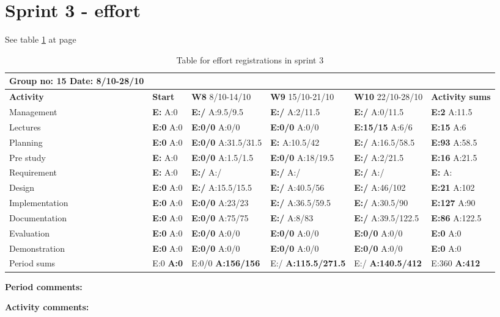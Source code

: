 \section{Sprint 3 - effort}

See table \ref{tab:effortweekss3} at page \pageref{tab:effortweekss3}
\begin{table}
\begin{tabularx}{\linewidth}{>{\setlength\hsize{.625\hsize}}X|>{\setlength\hsize{0.3\hsize}}X|>{\setlength\hsize{0.5\hsize}}X|>{\setlength\hsize{0.5\hsize}}X|>{\setlength\hsize{0.5\hsize}}X|>{\setlength\hsize{.3\hsize}}X}
Group no: 15 Date: 8/10-28/10  \\ \hline
\textbf{Activity} & \textbf{Start} & \textbf{W8} 8/10-14/10 & \textbf{W9} 15/10-21/10 & \textbf{W10} 22/10-28/10 & \textbf{Activity sums} \\ \hline \hline
Management & \textbf{E:} A:0 & \textbf{E:/} A:9.5/9.5 & \textbf{E:/} A:2/11.5 & \textbf{E:/} A:0/11.5 & \textbf{E:2} A:11.5  \\ \hline
Lectures & \textbf{E:0} A:0 & \textbf{E:0/0} A:0/0 & \textbf{E:0/0} A:0/0 & \textbf{E:15/15} A:6/6 & \textbf{E:15} A:6  \\ \hline
Planning & \textbf{E:0} A:0 & \textbf{E:0/0} A:31.5/31.5 & \textbf{E:} A:10.5/42 & \textbf{E:/} A:16.5/58.5 & \textbf{E:93} A:58.5  \\ \hline
Pre study & \textbf{E:} A:0 & \textbf{E:0/0} A:1.5/1.5 & \textbf{E:0/0} A:18/19.5 & \textbf{E:/} A:2/21.5 & \textbf{E:16} A:21.5  \\ \hline
Requirement & \textbf{E:} A:0 & \textbf{E:/} A:/ & \textbf{E:/} A:/ & \textbf{E:/} A:/ & \textbf{E: } A:  \\ \hline
Design & \textbf{E:0} A:0 & \textbf{E:/} A:15.5/15.5 & \textbf{E:/} A:40.5/56 & \textbf{E:/} A:46/102 & \textbf{E:21} A:102  \\ \hline
Implementation & \textbf{E:0} A:0 & \textbf{E:0/0} A:23/23 & \textbf{E:/} A:36.5/59.5 & \textbf{E:/} A:30.5/90 & \textbf{E:127} A:90  \\ \hline
Documentation & \textbf{E:0} A:0 & \textbf{E:0/0} A:75/75 & \textbf{E:/} A:8/83 & \textbf{E:/} A:39.5/122.5 & \textbf{E:86} A:122.5  \\ \hline
Evaluation & \textbf{E:0} A:0 & \textbf{E:0/0} A:0/0 & \textbf{E:0/0} A:0/0 & \textbf{E:0/0} A:0/0 & \textbf{E:0 } A:0  \\ \hline
Demonstration & \textbf{E:0} A:0 & \textbf{E:0/0} A:0/0 & \textbf{E:0/0} A:0/0 & \textbf{E:0/0} A:0/0 & \textbf{E:0 } A:0  \\ \hline
Period sums & E:0 \textbf{A:0} & E:0/0 \textbf{A:156/156} & E:/ \textbf{A:115.5/271.5} & E:/ \textbf{A:140.5/412} & E:360 \textbf{A:412}
\end{tabularx}

\textbf{Period comments:}


\textbf{Activity comments:}

\caption{Table for effort registrations in sprint 3} \label{tab:effortweekss3}
\end{table}
